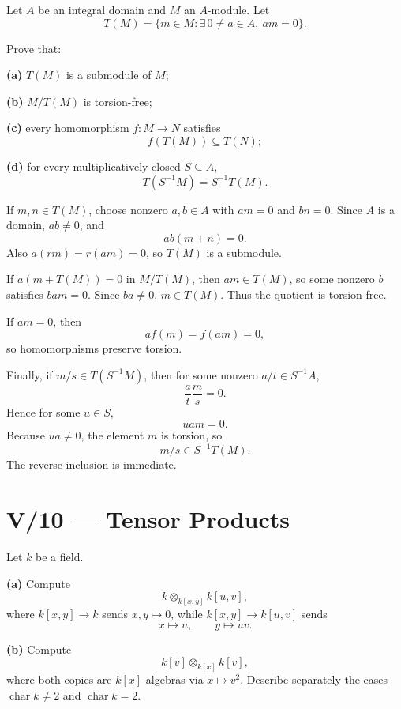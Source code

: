 \begin{problem}[CP-V-0049]
\label{prob:cp-v-0049}
Let \(A\) be an integral domain and \(M\) an \(A\)-module. Let
\[
T(M)=\{m\in M:\exists\,0\ne a\in A,\ am=0\}.
\]

Prove that:

\textbf{(a)} \(T(M)\) is a submodule of \(M\);

\textbf{(b)} \(M/T(M)\) is torsion-free;

\textbf{(c)} every homomorphism \(f:M\to N\) satisfies
\[
f(T(M))\subseteq T(N);
\]

\textbf{(d)} for every multiplicatively closed \(S\subseteq A\),
\[
T(S^{-1}M)=S^{-1}T(M).
\]
\end{problem}

\begin{solution}
If \(m,n\in T(M)\), choose nonzero \(a,b\in A\) with \(am=0\) and \(bn=0\).
Since \(A\) is a domain, \(ab\ne0\), and
\[
ab(m+n)=0.
\]
Also \(a(rm)=r(am)=0\), so \(T(M)\) is a submodule.

If \(a(m+T(M))=0\) in \(M/T(M)\), then \(am\in T(M)\), so some nonzero
\(b\) satisfies \(bam=0\). Since \(ba\ne0\), \(m\in T(M)\). Thus the quotient
is torsion-free.

If \(am=0\), then
\[
a f(m)=f(am)=0,
\]
so homomorphisms preserve torsion.

Finally, if \(m/s\in T(S^{-1}M)\), then for some nonzero \(a/t\in S^{-1}A\),
\[
\frac{a}{t}\frac{m}{s}=0.
\]
Hence for some \(u\in S\),
\[
uam=0.
\]
Because \(ua\ne0\), the element \(m\) is torsion, so
\[
m/s\in S^{-1}T(M).
\]
The reverse inclusion is immediate.
\end{solution}



\section*{V/10 --- Tensor Products}

\begin{problem}[CP-V-0018]
\label{prob:cp-v-0018}
Let \(k\) be a field.

\textbf{(a)} Compute
\[
k\otimes_{k[x,y]}k[u,v],
\]
where \(k[x,y]\to k\) sends \(x,y\mapsto0\), while
\(k[x,y]\to k[u,v]\) sends
\[
x\mapsto u,\qquad y\mapsto uv.
\]

\textbf{(b)} Compute
\[
k[v]\otimes_{k[x]}k[v],
\]
where both copies are \(k[x]\)-algebras via \(x\mapsto v^2\).
Describe separately the cases \(\operatorname{char}k\ne2\) and
\(\operatorname{char}k=2\).
\end{problem}

